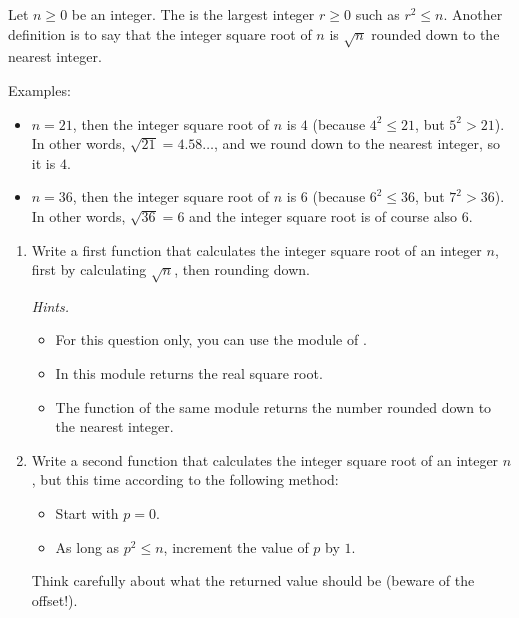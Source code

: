 \documentclass[11pt,class=report,crop=false]{standalone}
\begin{document}

\begin{activite}



Let $n \ge 0$ be an integer. 
The  is the largest integer $r\ge0$ such as $r^2 \le  n$. 
Another definition is to say that the integer square root of $n$ is $\sqrt{n}$ rounded down to the nearest integer.

Examples:
\begin{itemize}
  \item $n=21$, then the integer square root of $n$ is $4$ (because $4^2 \le 21$, but $5^2 > 21$). In other words, $\sqrt{21} = 4.58\ldots$, and we round down to the nearest integer, so it is $4$.
  
  \item $n=36$, then the integer square root of $n$ is $6$ (because $6^2 \le 36$, but $7^2 > 36$). In other words, $\sqrt{36} = 6$ and the integer square root is of course also $6$.    
\end{itemize}

\begin{enumerate}
  \item Write a first function that calculates the integer square root of an integer $n$, first by calculating $\sqrt{n}$, then rounding down.
  
  \emph{Hints.}
  \begin{itemize}
    \item For this question only, you can use the  module of \Python. 
    \item In this module  returns the real square root.
    \item The  function of the same module returns the number rounded down to the nearest integer.
  \end{itemize}
  
  \item Write a second function that calculates the integer square root of an integer $n$, but this time according to the following method:
  \begin{itemize}
    \item Start with $p=0$.
    \item As long as $p^2 \le n$, increment the value of $p$ by $1$.
  \end{itemize}
  Think carefully about what the returned value should be (beware of the offset!).
  

\end{enumerate}
\end{activite}
\end{document}

